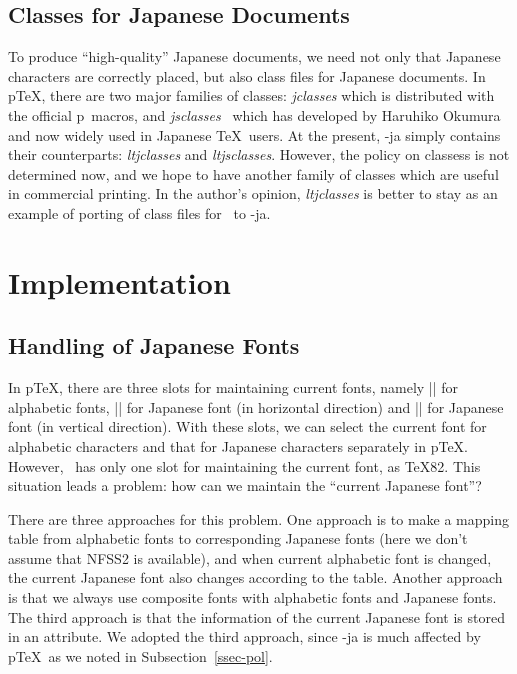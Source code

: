 \documentclass{ajt}
\begin{document}
\subsection{Classes for Japanese Documents}
To produce ``high-quality'' Japanese documents, we need not only that
Japanese characters are correctly placed, but also class files for
Japanese documents. In p\TeX, there are two major families of classes:
\emph{jclasses} which is distributed with the official p\LaTeXe\ macros,
and \emph{jsclasses}~\cite{jsclasses} which has developed by Haruhiko
Okumura and now widely used in Japanese \TeX\ users.  At the present,
\LuaTeX-ja simply contains their counterparts: \emph{ltjclasses} and
\emph{ltjsclasses}. However, the policy on classess is not determined
now, and we hope to have another family of classes which are useful in
commercial printing.  In the author's opinion, \emph{ltjclasses} is
better to stay as an example of porting of class files for \pTeX\ to
\LuaTeX-ja.


\section{Implementation}
\subsection{Handling of Japanese Fonts}
In p\TeX, there are three slots for maintaining current fonts, namely
|\font| for alphabetic fonts, |\jfont| for Japanese font (in horizontal
direction) and |\tfont| for Japanese font (in vertical direction). With
these slots, we can select the current font for alphabetic characters
and that for Japanese characters separately in p\TeX.  However, \LuaTeX\
has only one slot for maintaining the current font, as \TeX82.  This
situation leads a problem: how can we maintain the ``current Japanese
font''?

There are three approaches for this problem. One approach is to make a
mapping table from alphabetic fonts to corresponding Japanese fonts
(here we don't assume that NFSS2 is available), and when current
alphabetic font is changed, the current Japanese font also changes
according to the table.  Another approach is that we always use
composite fonts with alphabetic fonts and Japanese fonts. The third
approach is that the information of the current Japanese font is stored
in an attribute. We adopted the third approach, since \LuaTeX-ja is much
affected by p\TeX\ as we noted in Subsection~\ref{ssec-pol}.
\end{document}
